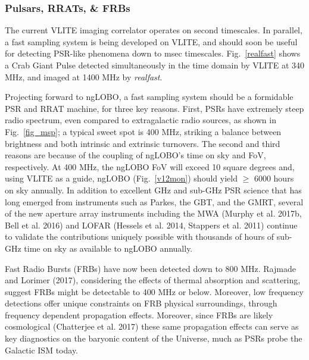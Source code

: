 \documentclass[11pt]{article}
\begin{document}
\subsubsection{Pulsars, RRATs, \& FRBs}

The current VLITE imaging correlator operates on second timescales. In parallel, a fast sampling system is being developed on VLITE, and should soon be useful for detecting PSR-like phenomena down to msec timescales. Fig.~\ref{realfast} shows a Crab Giant Pulse detected simultaneously in the time domain by VLITE at 340 MHz, and imaged at 1400 MHz by {\it realfast}.


Projecting forward to ngLOBO, a fast sampling system should  be a formidable PSR and RRAT machine, for three key reasons. First, PSRs have extremely steep radio spectrum, even compared to extragalactic radio sources, as shown in Fig.~\ref{fig_msp}; a typical sweet spot is 400 MHz, striking a balance between brightness and both intrinsic and extrinsic turnovers. The second and third reasons are because of the coupling of ngLOBO's time on sky and FoV, respectively. At 400 MHz, the ngLOBO FoV will exceed 10 square degrees and, using VLITE as a guide, ngLOBO (Fig.~\ref{v12mon}) should yield $\geq$ 6000 hours on sky annually. In addition to excellent GHz and sub-GHz PSR science that has long emerged from instruments such as Parkes, the GBT, and the GMRT, several of the new aperture array instruments including the MWA (Murphy et al. 2017b, Bell et al. 2016) and LOFAR (Hessels et al. 2014, Stappers et al. 2011) continue to validate the contributions uniquely possible with thousands of hours of sub-GHz time on sky as available to ngLOBO annually. 

Fast Radio Bursts (FRBs) have now been detected down to 800 MHz. Rajmade and Lorimer (2017), considering the effects of thermal absorption and scattering, suggest FRBs might be detectable to 400 MHz or below. Moreover, low frequency detections offer unique constraints on FRB physical surroundings, through frequency dependent propagation effects. Moreover, since FRBs are likely cosmological (Chatterjee et al. 2017) these same propagation effects can serve as key diagnostics on the baryonic content of the Universe, much as PSRs probe the Galactic ISM today. 
\end{document}
